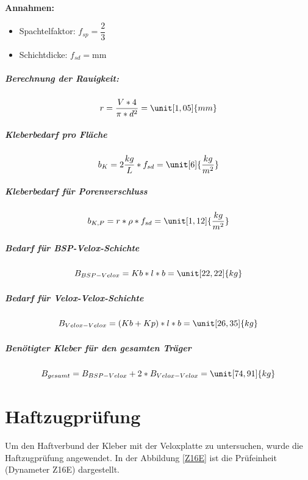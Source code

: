 \textbf{Annahmen:}

\begin{itemize}
\item Spachtelfaktor:	$f_{sp}=\dfrac{2}{3}$  
\item Schichtdicke:		$f_{sd}=$\unit[3]{mm}
\end{itemize}
 

\subparagraph{Berechnung der Rauigkeit:}
\begin{equation}
r=\dfrac{V*4}{\pi*d^{2}}=\unit[1,05]{mm}
\end{equation}

\subparagraph{Kleberbedarf pro Fläche}

\begin{equation}
b_{K}= 2\dfrac{kg}{L}*f_{sd}=\unit[6]{\dfrac{kg}{m^{2}}}
\end{equation}

\subparagraph{Kleberbedarf für Porenverschluss}

\begin{equation}
b_{K,P}=r*\rho*f_{sd}= \unit[1,12]{\dfrac{kg}{m^{2}}}
\end{equation}

\subparagraph{Bedarf für BSP-Velox-Schichte}

\begin{equation}
B_{BSP-Velox}=Kb*l*b=\unit[22,22]{kg}
\end{equation}

\subparagraph{Bedarf für Velox-Velox-Schichte}

\begin{equation}
B_{Velox-Velox}=(Kb+Kp)*l*b=\unit[26,35]{kg}
\end{equation}


\subparagraph{Benötigter Kleber für den gesamten Träger}

\begin{equation}
B_{gesamt}=B_{BSP-Velox}+2*B_{Velox-Velox}=\unit[74,91]{kg}
\end{equation}







\section{Haftzugprüfung}\label{{sec:Haftzugprufung}}
Um den Haftverbund der Kleber mit der Veloxplatte zu untersuchen, wurde die Haftzugprüfung angewendet. In der Abbildung \ref{Z16E} ist die Prüfeinheit (Dynameter Z16E) dargestellt.


